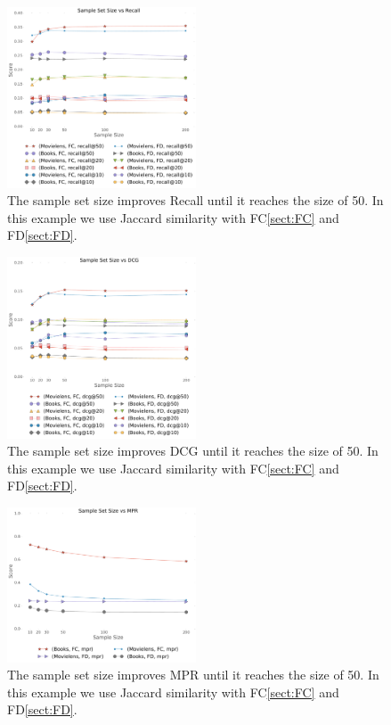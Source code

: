 \begin{figure}[t]
\includegraphics[width=0.5\textwidth]{reference_size_vs_Recall.pdf}
\caption[]{The sample set size improves Recall until it reaches the size of 50. In this example we use Jaccard similarity with FC\ref{sect:FC} and FD\ref{sect:FD}.}
\label{fig:samples_recall}
\end{figure}
\begin{figure}[t]
\includegraphics[width=0.5\textwidth]{reference_size_vs_DCG.pdf}
\caption[]{The sample set size improves DCG until it reaches the size of 50. In this example we use Jaccard similarity with FC\ref{sect:FC} and FD\ref{sect:FD}.}
\label{fig:samples_dcg}
\end{figure}
\begin{figure}[t]
\includegraphics[width=0.5\textwidth]{reference_size_vs_MPR.pdf}
\caption[]{The sample set size improves MPR until it reaches the size of 50. In this example we use Jaccard similarity with FC\ref{sect:FC} and FD\ref{sect:FD}.}
\label{fig:samples_mpr}
\end{figure}


